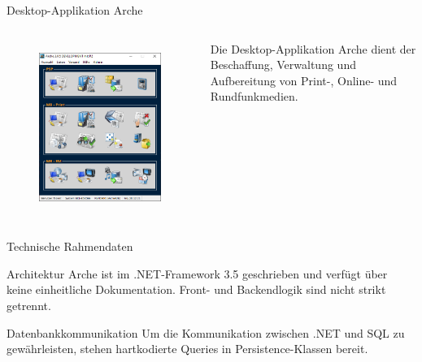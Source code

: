 \documentclass[toc]{beamer}
\begin{document}
        \begin{frame}{Desktop-Applikation \glqq Arche\grqq{}}
            \begin{columns}
                \begin{figure}[htp]
                                \centering
                                \includegraphics[scale=0.4]{arche.png}
                                \label{fig:my_label}
                            \end{figure}
                Die Desktop-Applikation \glqq Arche\grqq{} dient der Beschaffung, Verwaltung und Aufbereitung von Print-, Online- und Rundfunkmedien.
            \end{columns}
        \end{frame}
        
        \begin{frame}{Technische Rahmendaten}
            \begin{block}{Architektur}
                \glqq Arche\grqq{} ist im .NET-Framework 3.5 geschrieben und verfügt über keine einheitliche Dokumentation. Front- und Backendlogik sind nicht strikt getrennt.
            \end{block}
            \begin{block}{Datenbankkommunikation}
                Um die Kommunikation zwischen .NET und SQL zu gewährleisten, stehen hartkodierte Queries in Persistence-Klassen bereit.
            \end{block}
        \end{frame}
                
\end{document}
